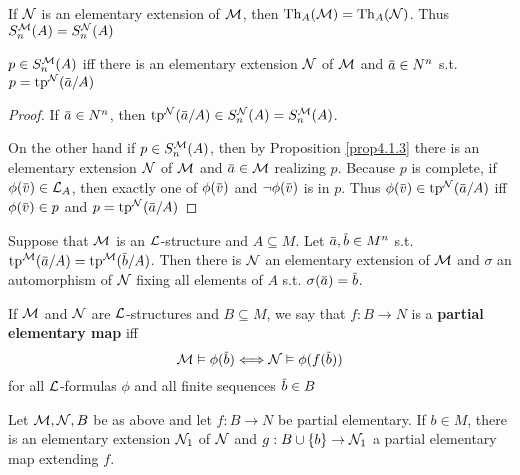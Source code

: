\documentclass[11pt]{article}
\begin{document}
If \(\mathcal{N}\) is an elementary extension of \(\mathcal{M}\), then \(\operatorname{Th}_A(\mathcal{M})=\operatorname{Th}_A(\mathcal{N})\). Thus \(S_n^{\mathcal{M}}(A)=S_n^{\mathcal{N}}(A)\)

\begin{corollary}[]
\(p\in S_n^{\mathcal{M}}(A)\) iff there is an elementary extension \(\mathcal{N}\) of \(\mathcal{M}\) and \(\bara\in N^n\) s.t. \(p=\tp^{\caln}(\bara/A)\)
\end{corollary}

\begin{proof}
If \(\bara\in N^n\), then \(\tp^{\caln}(\bara/A)\in S_n^{\caln}(A)=S_n^{\calm}(A)\).

On the other hand if \(p\in S_n^{\mathcal{M}}(A)\), then by Proposition \ref{prop4.1.3} there is an elementary
extension \(\mathcal{N}\) of \(\mathcal{M}\) and \(\bara\in\calm\) realizing \(p\). Because \(p\) is complete,
if \(\phi(\barv)\in\call_A\), then exactly one of \(\phi(\barv)\) and \(\neg\phi(\barv)\) is in \(p\).
Thus \(\phi(\barv)\in\tp^{\caln}(\bara/A)\) iff \(\phi(\barv)\in p\) and \(p=\tp^{\caln}(\bara/A)\)
\end{proof}

\begin{proposition}[]
\label{prop4.1.5}
Suppose that \(\mathcal{M}\) is an \(\mathcal{L}\)-structure and \(A\subseteq M\). Let \(\bara,\barb\in M^n\)
s.t. \(\tp^{\calm}(\bara/A)=\tp^{\calm}(\barb/A)\). Then there is \(\mathcal{N}\) an elementary extension of \(\mathcal{M}\)
and \(\sigma\) an automorphism of \(\mathcal{N}\) fixing all elements of \(A\) s.t. \(\sigma(\bara)=\barb\).
\end{proposition}


If \(\mathcal{M}\) and \(\mathcal{N}\) are \(\mathcal{L}\)-structures and \(B\subseteq M\), we say that \(f:B\to N\) is a \textbf{partial}
\textbf{elementary map} iff
\begin{equation*}
\calm\vDash\phi(\barb)\Longleftrightarrow\caln\vDash\phi(f(\barb))
\end{equation*}
for all \(\mathcal{L}\)-formulas \(\phi\) and all finite sequences \(\barb\in B\)

\begin{lemma}[]
\label{lemma4.1.6}
Let \(\mathcal{M},\mathcal{N},B\) be as above and let \(f:B\to N\) be partial elementary. If \(b\in M\), there is an
elementary extension \(\mathcal{N}_1\) of \(\mathcal{N}\) and \(g:B\cup\{b\}\to \mathcal{N}_1\) a partial elementary map extending \(f\).
\end{lemma}
\end{document}
